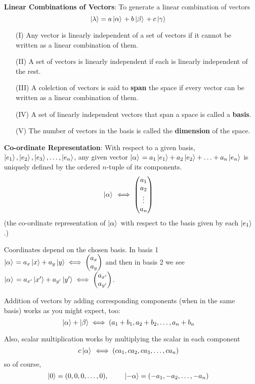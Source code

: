 \documentclass[english, 11pt]{article}
\begin{document}
        {\bf Linear Combinations of Vectors}: To generate a linear combination of vectors
        \[ \left|\lambda\right\rangle = a\left| \alpha \rangle \right. + b\left| \beta \rangle \right. + c\left| \gamma \rangle \right. \]
        \begin{itemize}
          \item[(I)] Any vector is linearly independent of a set of vectors if it cannot be written as a linear combination of them.
          \item[(II)] A set of vectors is linearly independent if each is linearly independent of the rest.
          \item[(III)] A colelction of vectors is said to {\bf span} the space if every vector can be written as a linear combination of them.
          \item[(IV)] A set of linearly independent vectors that span a space is called a {\bf basis}.
          \item[(V)] The number of vectors in the basis is called the {\bf dimension} of the space.\newline
        \end{itemize}

        {\bf Co-ordinate Representation}: With respect to a given basis, $\left|e_1\right\rangle, \left|e_2\right\rangle, \left|e_3\right\rangle, \hdots, \left|e_n\right\rangle$, any given vector $\left| \alpha \rangle \right. = a_1 \left|e_1\right\rangle + a_2\left|e_2\right\rangle + \hdots + a_n \left|e_n\right\rangle$ is uniquely defined by the ordered $n$-tuple of its components.
        \[ \left| \alpha \rangle \right. \iff \left(\begin{matrix}a_1 \\ a_2 \\ \vdots \\ a_n\end{matrix}\right) \]
        (the co-ordinate representation of $\left| \alpha \rangle \right.$ with respect to the basis given by each $\left|e_1\right\rangle$.)

        Coordinates depend on the chosen basis. In basis 1 $\left| \alpha \rangle \right. = a_x\left|x\right\rangle + a_y\left|y\right\rangle \iff \left(\begin{matrix}a_x \\ a_y \end{matrix}\right)$ and then in basis 2 we see $\left| \alpha \rangle \right. = a_{x'}\left|x'\right\rangle + a_{y'}\left|y'\right\rangle \iff \left(\begin{matrix}a_{x'} \\ a_{y'}\end{matrix}\right)$. \newline

        Addition of vectors by adding corresponding components (when in the same basis) works as you might expect, too:
        \[ \left|\alpha\right\rangle + \left|\beta\right\rangle \iff (a_1 + b_1, a_2 + b_2, \hdots, a_n + b_n \]

        Also, scalar multiplication works by multiplying the scalar in each component
        \[ c\left| \alpha \rangle \right. \iff (ca_1, ca_2, ca_3, \ldots, ca_n) \]
        so of course,
        \[ \ket{0} = (0, 0, 0, \ldots, 0),  \ \ \ \ \ \ \  \ket{-\alpha} = (-a_1, -a_2, \ldots, -a_n) \]
\end{document}
